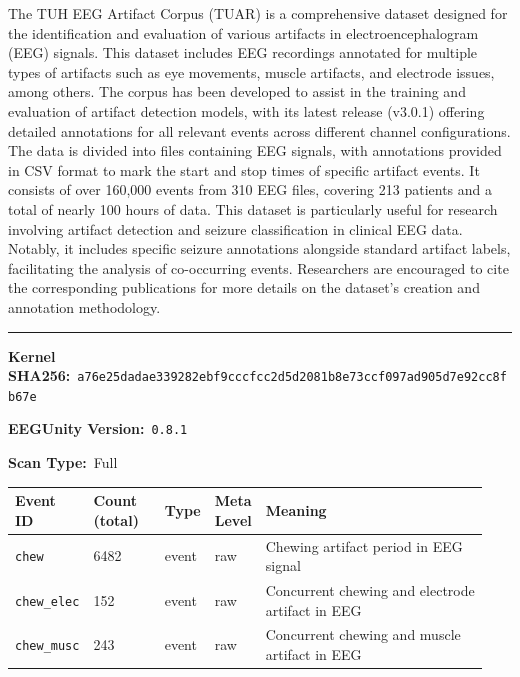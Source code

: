 {\begin{tcolorbox}
{\footnotesize The TUH EEG Artifact Corpus (TUAR) is a comprehensive dataset designed for the identification and evaluation of various artifacts in electroencephalogram (EEG) signals. This dataset includes EEG recordings annotated for multiple types of artifacts such as eye movements, muscle artifacts, and electrode issues, among others. The corpus has been developed to assist in the training and evaluation of artifact detection models, with its latest release (v3.0.1) offering detailed annotations for all relevant events across different channel configurations. The data is divided into files containing EEG signals, with annotations provided in CSV format to mark the start and stop times of specific artifact events. It consists of over 160,000 events from 310 EEG files, covering 213 patients and a total of nearly 100 hours of data. This dataset is particularly useful for research involving artifact detection and seizure classification in clinical EEG data. Notably, it includes specific seizure annotations alongside standard artifact labels, facilitating the analysis of co-occurring events. Researchers are encouraged to cite the corresponding publications for more details on the dataset's creation and annotation methodology.}
\noindent\rule{\linewidth}{0.4pt}\par\nopagebreak
{}\par\smallskip
{\scriptsize
\noindent\textbf{Kernel SHA256:}~\texttt{a76e25dadae339282ebf9cccfcc2d5d2081b8e73ccf097ad905d7e92cc8fb67e}\par\smallskip
\noindent\textbf{EEGUnity Version:}~\texttt{0.8.1}\par\smallskip
\noindent\textbf{Scan Type:}~Full\par\smallskip
}
\smallskip{}\par\smallskip
\begingroup\scriptsize\setlength{\tabcolsep}{2pt}
\begin{tabular}{@{}p{0.1567\linewidth}p{0.1567\linewidth}p{0.0783\linewidth}p{0.0783\linewidth}p{0.4700\linewidth}@{}}
\toprule
\textbf{Event ID} & \textbf{Count (total)} & \textbf{Type} & \textbf{Meta Level} & \textbf{Meaning} \\
\midrule
\texttt{chew} & 6482 & event & raw & Chewing artifact period in EEG signal \\
\texttt{chew\_\allowbreak{}elec} & 152 & event & raw & Concurrent chewing and electrode artifact in EEG \\
\texttt{chew\_\allowbreak{}musc} & 243 & event & raw & Concurrent chewing and muscle artifact in EEG \\

\end{tabular}
\end{tcolorbox}}
